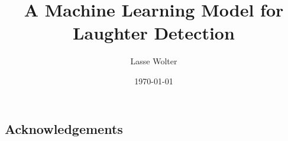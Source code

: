 \documentclass[bsc,frontabs,parskip,deptreport]{infthesis}
\begin{document}
\begin{preliminary}
\title{A Machine Learning Model for Laughter Detection}

\author{Lasse Wolter}



\date{\today}

\abstract{

}

\maketitle

\section*{Acknowledgements}


\setcounter{tocdepth}{1} %
\tableofcontents
\end{preliminary}


\end{document}
